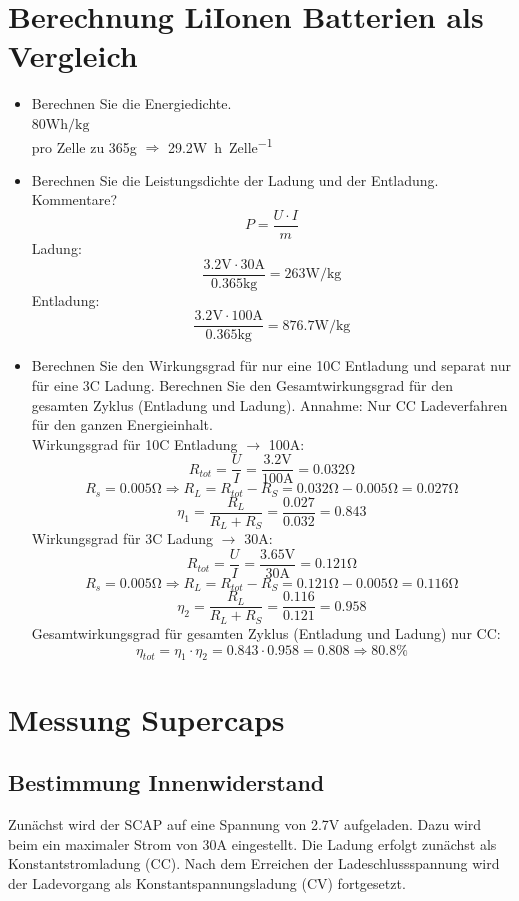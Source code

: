 \documentclass[a4,paper,fleqn]{article}
\begin{document}
\section{Berechnung LiIonen Batterien als Vergleich}
\begin{itemize}
\item Berechnen Sie die Energiedichte. \\
    $80\si{\watt\hour\per\kilogram}$ \\
    pro Zelle zu 365\si{\gram} $\Rightarrow$ 29.2\si{\watt\hour\per Zelle}
\item Berechnen Sie die Leistungsdichte der Ladung und der Entladung. 
Kommentare? \\
    \[ P = \frac{U \cdot I}{m} \]
    Ladung: 
    \[ \frac{3.2\si{\volt} \cdot 30\si{\ampere}}{0.365\si{\kilogram}} = 263 \si{\watt\per\kilogram} \]
    Entladung: 
    \[ \frac{3.2\si{\volt} \cdot 100\si{\ampere}}{0.365\si{\kilogram}} = 876.7 \si{\watt\per\kilogram} \]
\item  Berechnen Sie den Wirkungsgrad für nur eine 10C Entladung und separat 
nur für eine 3C Ladung.  Berechnen Sie den Gesamtwirkungsgrad für den 
gesamten Zyklus (Entladung und Ladung).  Annahme: Nur CC Ladeverfahren für 
den ganzen Energieinhalt. \\
    Wirkungsgrad für 10C Entladung $\to$ 100\si{\ampere}: 
    \[ R_{tot} = \frac{U}{I} = \frac{3.2\si{\volt}}{100\si{\ampere}} 
    = 0.032\si{\ohm} \]
    \[ R_s = 0.005\si{\ohm} \Rightarrow R_L 
    = R_{tot} - R_S = 0.032\si{\ohm} - 0.005\si{\ohm} = 0.027\si{\ohm} \]
    \[ \eta_1 = \frac{R_L}{R_L + R_S} = \frac{0.027}{0.032} = 0.843 \]
    Wirkungsgrad für 3C Ladung $\to$ 30\si{\ampere}: 
    \[ R_{tot} = \frac{U}{I} = \frac{3.65\si{\volt}}{30\si{\ampere}} 
    = 0.121\si{\ohm} \]
    \[ R_s = 0.005\si{\ohm} \Rightarrow R_L 
    = R_{tot} - R_S = 0.121\si{\ohm} - 0.005\si{\ohm} = 0.116\si{\ohm} \]
    \[ \eta_2 = \frac{R_L}{R_L + R_S} = \frac{0.116}{0.121} = 0.958 \]
    Gesamtwirkungsgrad für gesamten Zyklus (Entladung und Ladung) nur CC: \\
    \[ \eta_{tot} = \eta_1 \cdot \eta_2 = 0.843 \cdot 0.958 
    = 0.808 \Rightarrow 80.8\% \]
\end{itemize}

\section{Messung Supercaps}
\subsection{Bestimmung Innenwiderstand}
Zunächst wird der SCAP auf eine Spannung von 2.7\si{\volt} aufgeladen. Dazu 
wird beim ein maximaler Strom von 30\si{\ampere} eingestellt. Die Ladung 
erfolgt zunächst als Konstantstromladung (CC). Nach dem Erreichen der 
Ladeschlussspannung wird der Ladevorgang als Konstantspannungsladung (CV) 
fortgesetzt. 
\end{document}
